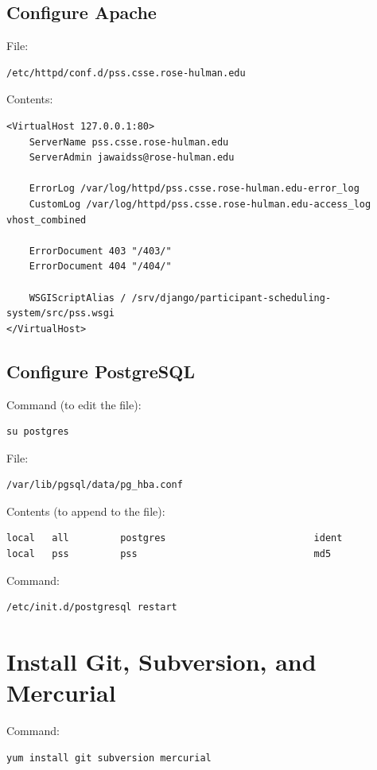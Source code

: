 \documentclass{article}
\begin{document}
\subsection{Configure Apache}

File:
\begin{verbatim}
/etc/httpd/conf.d/pss.csse.rose-hulman.edu
\end{verbatim}

Contents:
\begin{verbatim}
<VirtualHost 127.0.0.1:80>
    ServerName pss.csse.rose-hulman.edu
    ServerAdmin jawaidss@rose-hulman.edu

    ErrorLog /var/log/httpd/pss.csse.rose-hulman.edu-error_log
    CustomLog /var/log/httpd/pss.csse.rose-hulman.edu-access_log vhost_combined

    ErrorDocument 403 "/403/"
    ErrorDocument 404 "/404/"

    WSGIScriptAlias / /srv/django/participant-scheduling-system/src/pss.wsgi
</VirtualHost>
\end{verbatim}

\subsection{Configure PostgreSQL}

Command (to edit the file):
\begin{verbatim}
su postgres
\end{verbatim}

File:
\begin{verbatim}
/var/lib/pgsql/data/pg_hba.conf
\end{verbatim}

Contents (to append to the file):
\begin{verbatim}
local   all         postgres                          ident
local   pss         pss                               md5
\end{verbatim}

Command:
\begin{verbatim}
/etc/init.d/postgresql restart
\end{verbatim}

\section{Install Git, Subversion, and Mercurial}

Command:
\begin{verbatim}
yum install git subversion mercurial
\end{verbatim}
\end{document}
